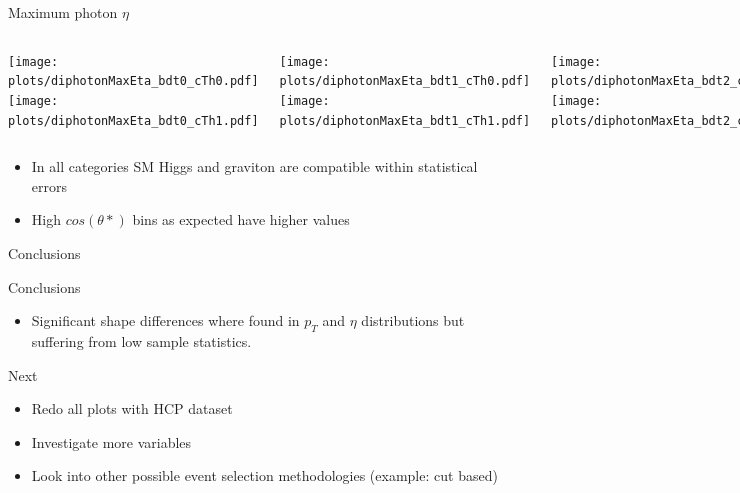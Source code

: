 \documentclass[8pt]{beamer}
\begin{document}
\begin{frame}{Maximum photon $\eta$}

  \begin{block}
   
     \begin{columns}
     
      \centering
     
      \column[t]{3.0cm}
      \texttt{[image: plots/diphotonMaxEta\_bdt0\_cTh0.pdf]} \\
      \texttt{[image: plots/diphotonMaxEta\_bdt0\_cTh1.pdf]} 
      
      \column[t]{3.0cm}
      \texttt{[image: plots/diphotonMaxEta\_bdt1\_cTh0.pdf]} \\
      \texttt{[image: plots/diphotonMaxEta\_bdt1\_cTh1.pdf]}
      
      \column[t]{3.0cm}
      \texttt{[image: plots/diphotonMaxEta\_bdt2\_cTh0.pdf]} \\
      \texttt{[image: plots/diphotonMaxEta\_bdt2\_cTh1.pdf]}
      
      \column[t]{3.0cm}
      \texttt{[image: plots/diphotonMaxEta\_bdt3\_cTh0.pdf]} \\
      \texttt{[image: plots/diphotonMaxEta\_bdt3\_cTh1.pdf]}
      
    \end{columns}
  
  \end{block}

    \begin{itemize}
    \item In all categories SM Higgs and graviton are compatible within statistical errors
    \item High $cos(\theta *)$ bins as expected have higher values
  \end{itemize}
  
\end{frame}

\begin{frame}{Conclusions}
 
  \begin{block}{Conclusions}

  \begin{itemize}
    \item Significant shape differences where found in $p_T$ and $\eta$ distributions but suffering from low sample statistics.
  \end{itemize}

  \end{block}

  \begin{block}{Next}

    \begin{itemize}
      \item Redo all plots with HCP dataset
      \item Investigate more variables
      \item Look into other possible event selection methodologies (example: cut based)
    \end{itemize}

  \end{block}
  
\end{frame}
\end{document}
